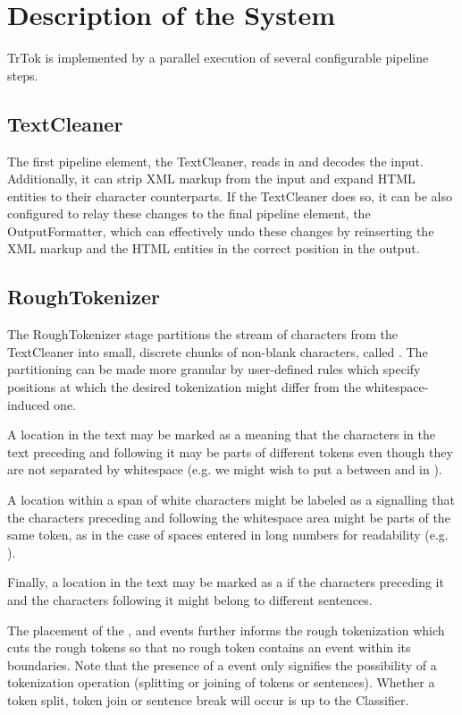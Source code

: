 \section{Description of the System}
\label{sec:system}

TrTok is implemented by a parallel execution of several configurable
pipeline steps.

\subsection{TextCleaner}

The first pipeline element, the TextCleaner, reads in and decodes the
input. Additionally, it can strip XML markup from the input and expand
HTML entities to their character counterparts. If the TextCleaner does
so, it can be also configured to relay these changes to the final
pipeline element, the OutputFormatter, which can effectively undo
these changes by reinserting the XML markup and the HTML entities in
the correct position in the output.

\subsection{RoughTokenizer}

The RoughTokenizer stage partitions the stream of characters from the
TextCleaner into small, discrete chunks of non-blank characters,
called . The partitioning can be made more
granular by user-defined rules which specify positions at which the
desired tokenization might differ from the whitespace-induced one.

A location in the text may be marked as a \maysplit{} meaning that the
characters in the text preceding and following it may be parts of
different tokens even though they are not separated by whitespace
(e.g. we might wish to put a \maysplit{} between  and
 in ).

A location within a span of white characters might be labeled as a
\mayjoin{} signalling that the characters preceding and following the
whitespace area might be parts of the same token, as in the case of
spaces entered in long numbers for readability (e.g.
).

Finally, a location in the text may be marked as a \maybreaksentence{}
if the characters preceding it and the characters following it might
belong to different sentences.

The placement of the \maysplit{}, \mayjoin{} and \maybreaksentence{}
events further informs the rough tokenization which cuts the rough
tokens so that no rough token contains an event within its boundaries.
Note that the presence of a \may{} event only signifies the
possibility of a tokenization operation (splitting or joining of
tokens or sentences). Whether a token split, token join or sentence
break will occur is up to the Classifier.

